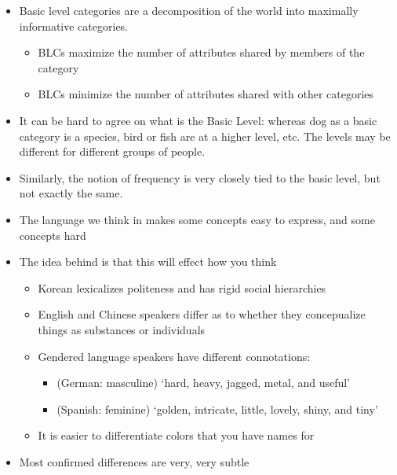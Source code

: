 \documentclass[headrule,footrule]{foils}
\begin{document}
\myslide{}
\begin{itemize}
\item Basic level categories are a decomposition of the world into
  maximally informative categories. 
  \begin{itemize}
  \item BLCs maximize the number of attributes shared by members of
    the category
  \item BLCs minimize the number of attributes shared with
    other categories
  \end{itemize}
\item It can be hard to agree on what is the Basic Level: whereas dog
  as a basic category is a species, bird or fish are at a higher
  level, etc.  The levels may be different for different groups of people.
\item Similarly, the notion of frequency is very closely tied
  to the basic level, but not exactly the same.
\end{itemize}


\begin{itemize}\addtolength{\itemsep}{-0.95ex}
\item The language we think in makes some concepts easy to express,
  and some concepts hard
\item The idea behind  is that this will
  effect how you think
  \begin{itemize}
  \item Korean lexicalizes politeness and has rigid social hierarchies
  \item English and Chinese speakers differ as to whether they
    concepualize things as substances or individuals
  \item Gendered language speakers have different connotations: 
    \begin{itemize}
    \item (German: masculine) `hard, heavy, jagged, metal, and useful'
    \item (Spanish: feminine)  `golden, intricate, little, lovely, shiny, and tiny'
    \end{itemize}
  \item It is easier to differentiate colors that you have names for
  \end{itemize}
\item Most confirmed differences are very, very subtle
\end{itemize}
\end{document}
